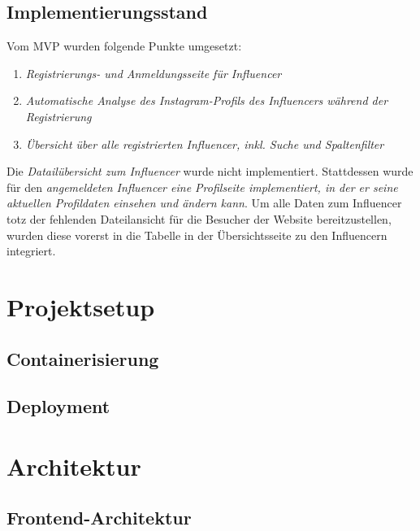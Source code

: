 \documentclass[conference,a4paper,flushend]{cs-techrep}
\begin{document}
\subsection{Implementierungsstand}
Vom MVP wurden folgende Punkte umgesetzt:
\begin{enumerate}
\item{\textit{Registrierungs- und Anmeldungsseite für Influencer}}
\item{\textit{Automatische Analyse des Instagram-Profils des Influencers während der Registrierung}}
\item{\textit{Übersicht über alle registrierten Influencer, inkl. Suche und Spaltenfilter}}
\end{enumerate}

Die \textit{Datailübersicht zum Influencer} wurde nicht implementiert. Stattdessen wurde für den \textit{angemeldeten Influencer eine Profilseite implementiert, in der er seine aktuellen Profildaten einsehen und ändern kann}. Um alle Daten zum Influencer totz der fehlenden Dateilansicht für die Besucher der Website bereitzustellen, wurden diese vorerst in die Tabelle in der Übersichtsseite zu den Influencern integriert. \\



\section{Projektsetup}

\subsection{Containerisierung}

\subsection{Deployment}

\section{Architektur}
\subsection{Frontend-Architektur}
\end{document}
